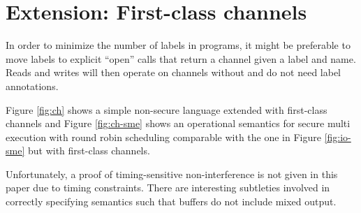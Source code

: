 \documentclass[10pt,preprint]{sigplanconf}
\begin{document}
\section{Extension: First-class channels}

In order to minimize the number of labels in programs, it might be preferable to move labels to explicit ``open'' calls that return a channel given a label and name.  Reads and writes will then operate on channels without and do not need label annotations.

Figure \ref{fig:ch} shows a simple non-secure language extended with first-class channels and Figure \ref{fig:ch-sme} shows an operational semantics for secure multi execution with round robin scheduling comparable with the one in Figure \ref{fig:io-sme} but with first-class channels.

Unfortunately, a proof of timing-sensitive non-interference is not given in this paper due to timing constraints.  There are interesting subtleties involved in correctly specifying semantics such that buffers do not include mixed output.
\end{document}
